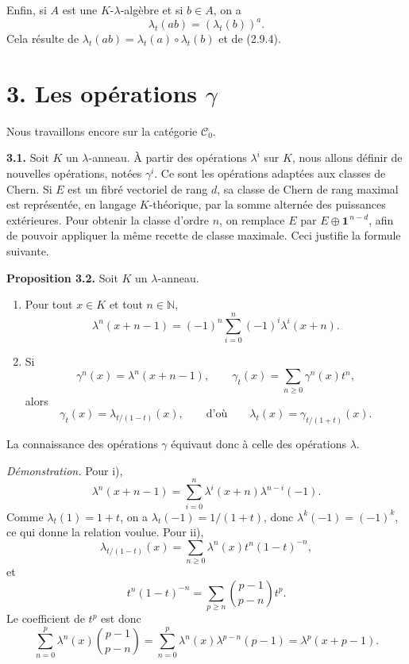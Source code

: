 \documentclass[11pt]{article}
\begin{document}
Enfin, si \(A\) est une \(K\)-\(\lambda\)-algèbre et si \(b\in A\), on a
\begin{equation}\tag{2.9.5}
  \lambda_t(ab)=(\lambda_t(b))^a .
\end{equation}
Cela résulte de \(\lambda_t(ab)=\lambda_t(a)\circ\lambda_t(b)\) et de (2.9.4).

\section*{3. Les opérations \(\gamma\)}

Nous travaillons encore sur la catégorie \(\mathscr C_0\).

\textbf{3.1.} Soit \(K\) un \(\lambda\)-anneau. À partir des opérations \(\lambda^i\) sur \(K\), nous allons définir de nouvelles opérations, notées \(\gamma^i\). Ce sont les opérations adaptées aux classes de Chern. Si \(E\) est un fibré vectoriel de rang \(d\), sa classe de Chern de rang maximal est représentée, en langage \(K\)-théorique, par la somme alternée des puissances extérieures. Pour obtenir la classe d'ordre \(n\), on remplace \(E\) par \(E\oplus\mathbf1^{\,n-d}\), afin de pouvoir appliquer la même recette de classe maximale. Ceci justifie la formule suivante.

\textbf{Proposition 3.2.} Soit \(K\) un \(\lambda\)-anneau.
\begin{enumerate}[label=\roman*)]
\item Pour tout \(x\in K\) et tout \(n\in\mathbb N\),
\[
  \lambda^n(x+n-1)=(-1)^n\sum_{i=0}^n(-1)^i\lambda^i(x+n).
\]
\item Si
\[
  \gamma^n(x)=\lambda^n(x+n-1),\qquad
  \gamma_t(x)=\sum_{n\ge0}\gamma^n(x)t^n,
\]
alors
\[
  \gamma_t(x)=\lambda_{t/(1-t)}(x),
  \qquad\text{d'où}\qquad
  \lambda_t(x)=\gamma_{t/(1+t)}(x).
\]
\end{enumerate}
La connaissance des opérations \(\gamma\) équivaut donc à celle des opérations \(\lambda\).

\emph{Démonstration.} Pour i),
\[
  \lambda^n(x+n-1)=\sum_{i=0}^{n}\lambda^i(x+n)\lambda^{n-i}(-1).
\]
Comme \(\lambda_t(1)=1+t\), on a \(\lambda_t(-1)=1/(1+t)\), donc \(\lambda^k(-1)=(-1)^k\), ce qui donne la relation voulue. Pour ii),
\[
  \lambda_{t/(1-t)}(x)=\sum_{n\ge0}\lambda^n(x)t^n(1-t)^{-n},
\]
et
\[
  t^n(1-t)^{-n}=\sum_{p\ge n}\binom{p-1}{p-n}t^p.
\]
Le coefficient de \(t^p\) est donc
\[
  \sum_{n=0}^{p}\lambda^n(x)\binom{p-1}{p-n}
  =\sum_{n=0}^{p}\lambda^n(x)\lambda^{p-n}(p-1)
  =\lambda^p(x+p-1).
\]
\end{document}
